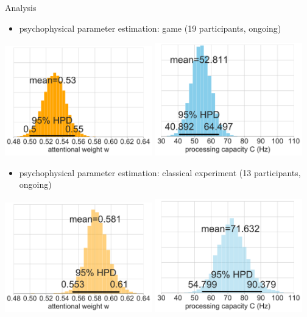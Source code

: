 \documentclass[a0paper,portrait]{baposter}
\begin{document}
\begin{poster}
\begin{posterbox}[name=results,span=1,column=2,row=0]{Analysis}
			\begin{itemize}
				\item psychophysical parameter estimation: game (19 participants, ongoing)
			\end{itemize}
			
			\begin{center}
				\includegraphics[width=0.48\textwidth]{game-w-hdi.pdf}
				\includegraphics[width=0.48\textwidth]{game-c-hdi.pdf}
			\end{center}
			
			\begin{itemize}
				\item psychophysical parameter estimation: classical experiment (13 participants, ongoing)
			\end{itemize}
			
			\begin{center}
				\includegraphics[width=0.48\textwidth]{exp-w-hdi-rs.pdf}
				\includegraphics[width=0.48\textwidth]{exp-c-hdi-rs.pdf}
			\end{center}
			

\end{posterbox}
\end{poster}
\end{document}
